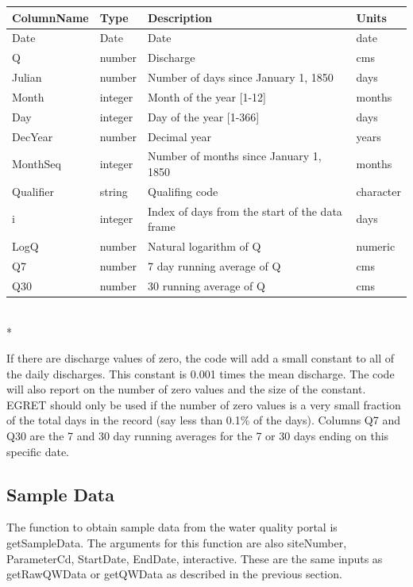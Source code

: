 \documentclass[a4paper,11pt]{article}
\begin{document}
\begin{tabular}{llll}
  \hline
ColumnName & Type & Description & Units \\ 
  \hline
Date & Date & Date & date \\ 
  Q & number & Discharge & cms \\ 
  Julian & number & Number of days since January 1, 1850 & days \\ 
  Month & integer & Month of the year [1-12] & months \\ 
  Day & integer & Day of the year [1-366] & days \\ 
  DecYear & number & Decimal year & years \\ 
  MonthSeq & integer & Number of months since January 1, 1850 & months \\ 
  Qualifier & string & Qualifing code & character \\ 
  i & integer & Index of days from the start of the data frame & days \\ 
  LogQ & number & Natural logarithm of Q & numeric \\ 
  Q7 & number & 7 day running average of Q & cms \\ 
  Q30 & number & 30 running average of Q & cms \\ 
   \hline
\end{tabular}\\*

If there are discharge values of zero, the code will add a small constant to all of the daily discharges.  This constant is 0.001 times the mean discharge.  The code will also report on the number of zero values and the size of the constant.  EGRET should only be used if the number of zero values is a very small fraction of the total days in the record (say less than 0.1\% of the days).  Columns Q7 and Q30 are the 7 and 30 day running averages for the 7 or 30 days ending on this specific date.

\FloatBarrier
\subsection{Sample Data}
The function to obtain sample data from the water quality portal is getSampleData. The arguments for this function are also siteNumber, ParameterCd, StartDate, EndDate, interactive. These are the same inputs as getRawQWData or getQWData as described in the previous section.
\end{document}
